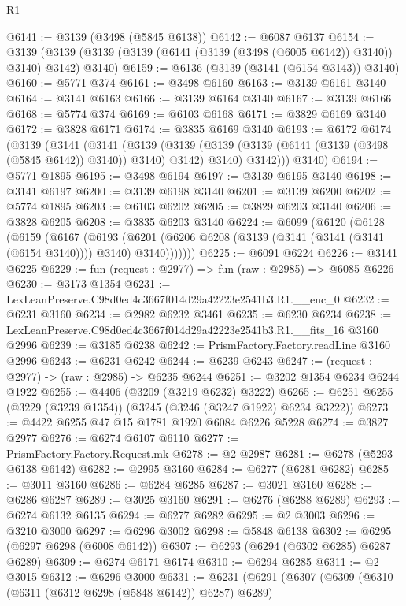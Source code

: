 \begin{lexlean}{R1}
\begin{coremodule}
@6141 := @3139 (@3498 (@5845 @6138))
@6142 := @6087 @6137
@6154 := @3139 (@3139 (@3139 (@3139 (@6141 (@3139 (@3498 (@6005 @6142)) @3140)) @3140) @3142) @3140)
@6159 := @6136 (@3139 (@3141 (@6154 @3143)) @3140)
@6160 := @5771 @374
@6161 := @3498 @6160
@6163 := @3139 @6161 @3140
@6164 := @3141 @6163
@6166 := @3139 @6164 @3140
@6167 := @3139 @6166
@6168 := @5774 @374
@6169 := @6103 @6168
@6171 := @3829 @6169 @3140
@6172 := @3828 @6171
@6174 := @3835 @6169 @3140
@6193 := @6172
    @6174
    (@3139
      (@3141
        (@3141
          (@3139
            (@3139 (@3139 (@3139 (@6141 (@3139 (@3498 (@5845 @6142)) @3140)) @3140) @3142) @3140)
            @3142)))
      @3140)
@6194 := @5771 @1895
@6195 := @3498 @6194
@6197 := @3139 @6195 @3140
@6198 := @3141 @6197
@6200 := @3139 @6198 @3140
@6201 := @3139 @6200
@6202 := @5774 @1895
@6203 := @6103 @6202
@6205 := @3829 @6203 @3140
@6206 := @3828 @6205
@6208 := @3835 @6203 @3140
@6224 := @6099
    (@6120
      (@6128
        (@6159
          (@6167
            (@6193
              (@6201 (@6206 @6208 (@3139 (@3141 (@3141 (@3141 (@6154 @3140)))) @3140) @3140)))))))
@6225 := @6091 @6224
@6226 := @3141 @6225
@6229 := fun (request : @2977) => fun (raw : @2985) => @6085 @6226
@6230 := @3173 @1354
@6231 := LexLeanPreserve.C98d0ed4c3667f014d29a42223e2541b3.R1.__enc_0
@6232 := @6231 @3160
@6234 := @2982 @6232 @3461
@6235 := @6230 @6234
@6238 := LexLeanPreserve.C98d0ed4c3667f014d29a42223e2541b3.R1.__fits_16 @3160 @2996
@6239 := @3185 @6238
@6242 := PrismFactory.Factory.readLine @3160 @2996
@6243 := @6231 @6242
@6244 := @6239 @6243
@6247 := (request : @2977) -> (raw : @2985) -> @6235 @6244
@6251 := @3202 @1354 @6234 @6244 @1922
@6255 := @4406 (@3209 (@3219 @6232) @3222)
@6265 := @6251 @6255 (@3229 (@3239 @1354)) (@3245 (@3246 (@3247 @1922) @6234 @3222))
@6273 := @4422 @6255 @47 @15 @1781 @1920 @6084 @6226 @5228
@6274 := @3827 @2977
@6276 := @6274 @6107 @6110
@6277 := PrismFactory.Factory.Request.mk
@6278 := @2 @2987
@6281 := @6278 (@5293 @6138 @6142)
@6282 := @2995 @3160
@6284 := @6277 (@6281 @6282)
@6285 := @3011 @3160
@6286 := @6284 @6285
@6287 := @3021 @3160
@6288 := @6286 @6287
@6289 := @3025 @3160
@6291 := @6276 (@6288 @6289)
@6293 := @6274 @6132 @6135
@6294 := @6277 @6282
@6295 := @2 @3003
@6296 := @3210 @3000
@6297 := @6296 @3002
@6298 := @5848 @6138
@6302 := @6295 (@6297 @6298 (@6008 @6142))
@6307 := @6293 (@6294 (@6302 @6285) @6287 @6289)
@6309 := @6274 @6171 @6174
@6310 := @6294 @6285
@6311 := @2 @3015
@6312 := @6296 @3000
@6331 := @6231
    (@6291
      (@6307
        (@6309
          (@6310 (@6311 (@6312 @6298 (@5848 @6142)) @6287) @6289)

\end{coremodule}
\end{lexlean}
